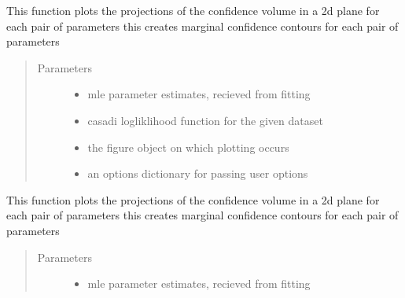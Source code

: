 \documentclass[letterpaper,10pt,english,openany,oneside]{sphinxmanual}
\begin{document}
\begin{fulllineitems}

\begin{fulllineitems}
\label{\detokenize{nloed:nloed.model.Model.__contourplot}}
This function plots the projections of the confidence volume in a 2d plane for each pair of parameters
this creates marginal confidence contours for each pair of parameters
\begin{quote}\begin{description}
\item[{Parameters}] \leavevmode\begin{itemize}
\item {} 
 \textendash{} mle parameter estimates,  recieved from fitting

\item {} 
 \textendash{} casadi logliklihood function for the given dataset

\item {} 
 \textendash{} the figure object on which plotting occurs

\item {} 
 \textendash{} an options dictionary for passing user options

\end{itemize}

\end{description}\end{quote}

\end{fulllineitems}


\begin{fulllineitems}
\label{\detokenize{nloed:nloed.model.Model.__contourtrace}}
This function plots the projections of the confidence volume in a 2d plane for each pair of parameters
this creates marginal confidence contours for each pair of parameters
\begin{quote}\begin{description}
\item[{Parameters}] \leavevmode\begin{itemize}
\item {} 
 \textendash{} mle parameter estimates,  recieved from fitting


\end{itemize}
\end{description}
\end{quote}
\end{fulllineitems}
\end{fulllineitems}
\end{document}
